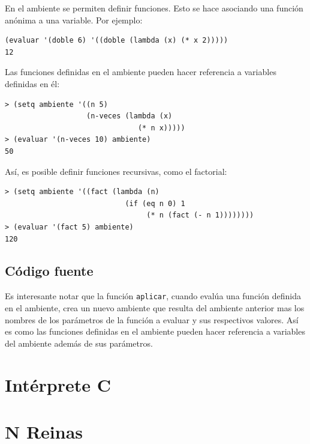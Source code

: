 \documentclass[12pt,titlepage]{article}
\begin{document}
En el ambiente se permiten definir funciones. Esto se hace asociando una función anónima a una variable. Por ejemplo:
\begin{lstlisting}
(evaluar '(doble 6) '((doble (lambda (x) (* x 2)))))
12
\end{lstlisting}

Las funciones definidas en el ambiente pueden hacer referencia a variables definidas en él:
\begin{lstlisting}
> (setq ambiente '((n 5) 
                   (n-veces (lambda (x) 
                               (* n x)))))
> (evaluar '(n-veces 10) ambiente)
50
\end{lstlisting}

Así, es posible definir funciones recursivas, como el factorial:
\begin{lstlisting}
> (setq ambiente '((fact (lambda (n) 
                            (if (eq n 0) 1
                                 (* n (fact (- n 1))))))))
> (evaluar '(fact 5) ambiente)
120
\end{lstlisting}

\subsection{Código fuente}



Es interesante notar que la función \lstinline|aplicar|, cuando evalúa una función definida en el ambiente, crea un nuevo ambiente que resulta del ambiente anterior mas los nombres de los parámetros de la función a evaluar y sus respectivos valores. Así es como las funciones definidas en el ambiente pueden hacer referencia a variables del ambiente además de sus parámetros.

\section{Intérprete C}
\section{N Reinas}

\end{document}
